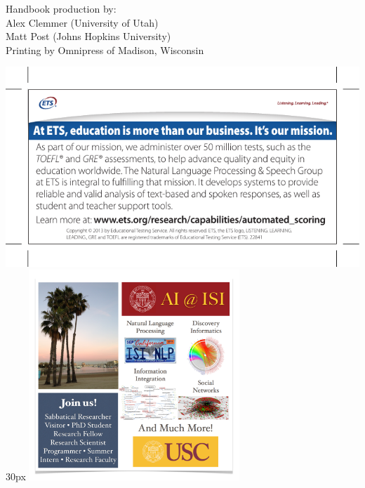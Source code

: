 \documentclass[twoside,makeidx]{book}
\begin{document}
\fancyfoot[C]{}
 
\fancyfoot[C]{\thepage}

\thispagestyle{empty}
\mbox{}

\vfill
\noindent Handbook production by: \\ 
\indent Alex Clemmer (University of Utah) \\
\indent Matt Post (Johns Hopkins University) \\  
Printing by Omnipress of Madison, Wisconsin
\newpage

\frontmatter

\clearpage

\clearpage

\clearpage%
\setheaders{}{}

\clearpage
%
\clearpage%
\setheaders{}{}

\setcounter{tocdepth}{2}
\tableofcontents
\mainmatter
\pagestyle{fancy}

%
\clearpage




% 
%
% 
%  
%  
%  
% 


\clearpage
\includegraphics{ads/ETS.pdf}
\vfill{30px}
\includegraphics[height=300px]{ads/ISI.pdf}
\end{document}

